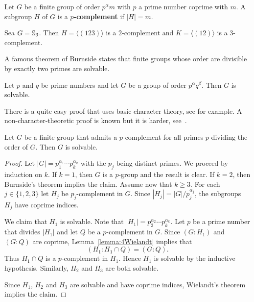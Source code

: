 Let $G$ be a finite group of order $p^{\alpha}m$ with $p$ a prime number coprime with $m$. 
A subgroup $H$ of $G$ is a \textbf{$p$-complement} if $|H|=m$. 

\begin{example}
	Sea $G=\mathbb{S}_3$. Then $H=\langle (123)\rangle$ is a $2$-complement 
	and $K=\langle (12)\rangle$ is a $3$-complement.
\end{example}

A famous theorem of Burnside states that finite groups whose order are divisible 
by exactly two primes are solvable. 

\begin{theorem}[Burnside]
Let $p$ and $q$ be prime numbers and let $G$ be a group of order $p^\alpha q^\beta$. Then
$G$ is solvable. 
\end{theorem}

There is a quite easy proof that uses basic character theory, see for example.
A non-character-theoretic proof is known but it is harder, see~\cite{MR2426855}.

\begin{theorem}[Hall]
	\label{theorem:Hall:solvable}
	Let $G$ be a finite group that admits a $p$-complement for all primes
	$p$ dividing the order of $G$. Then $G$ is solvable. 
\end{theorem}

\begin{proof}
	Let $|G|=p_1^{\alpha_1}\cdots
	p_k^{\alpha_k}$ with the $p_j$ being distinct primes. We proceed by induction on 
	$k$. If $k=1$, then $G$ is a $p$-group and the result is clear. If $k=2$, then 
	Burnside's theorem implies the claim. Assume now that $k\geq3$. For each 
	$j\in\{1,2,3\}$ let $H_j$ be $p_j$-complement in
	$G$. Since $|H_j|=|G|/p_j^{\alpha_j}$, the subgroups $H_j$ have coprime indices. 
	
	We claim that $H_1$ is solvable. Note that $|H_1|=p_2^{\alpha_2}\cdots
	p_k^{\alpha_k}$. Let $p$ be a prime number that divides $|H_1|$ and let $Q$ be a 
	$p$-complement in $G$. 
	Since $(G:H_1)$ and $(G:Q)$ are coprime, Lemma~\ref{lemma:4Wielandt} implies that 
	\[
	(H_1:H_1\cap Q)=(G:Q).
	\]
	Thus $H_1\cap Q$ is a $p$-complement in $H_1$. Hence $H_1$ is
	solvable by the inductive hypothesis. Similarly, $H_2$ and 
	$H_3$ are both solvable. 
	
	Since $H_1$, $H_2$ and $H_3$ are solvable and have coprime indices, Wielandt's theorem
	implies the claim. 
\end{proof}

